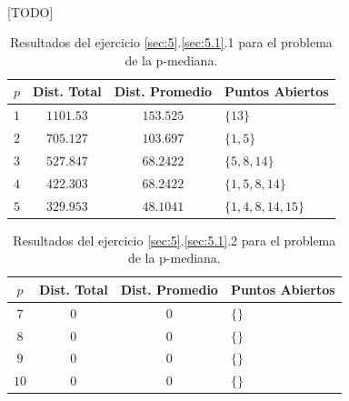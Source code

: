 \documentclass[spanish]{article}
\begin{document}
			\paragraph{}
			[TODO]


			\begin{table}[h]
				\begin{center}
					\begin{tabular}{|c || c || c || l | }
						\hline
						$p$		& Dist. Total 	& Dist. Promedio	& Puntos Abiertos	 \\ \hline \hline
						$1$ 	& $1101.53$ 		& $153.525$						& $\{13\}$ \\ \hline
						$2$ 	& $705.127$ 		& $103.697$					& $\{1,5\}$ \\ \hline
						$3$ 	& $527.847$ 		& $68.2422$					& $\{5,8,14\}$ \\ \hline
						$4$ 	& $422.303$ 		& $68.2422$					& $\{1,5,8,14\}$ \\ \hline
						$5$ 	& $329.953$ 		& $48.1041$					& $\{1,4,8,14,15\}$ \\
						\hline
					\end{tabular}
				\end{center}
				\caption{Resultados del ejercicio \ref{sec:5}.\ref{sec:5.1}.1 para el problema de la p-mediana.}
				\label{table:sol-5.3.1}
			\end{table}

			\begin{table}[h]
				\begin{center}
					\begin{tabular}{|c || c || c || l | }
						\hline
						$p$		& Dist. Total 	& Dist. Promedio	& Puntos Abiertos	 \\ \hline \hline
						$7$ 	& $0$ 					& $0$						& $\{\}$ \\ \hline
						$8$ 	& $0$ 					& $0$					& $\{\}$ \\ \hline
						$9$ 	& $0$ 					& $0$					& $\{\}$ \\ \hline
						$10$ 	& $0$ 					& $0$					& $\{\}$ \\
						\hline
					\end{tabular}
				\end{center}
				\caption{Resultados del ejercicio \ref{sec:5}.\ref{sec:5.1}.2 para el problema de la p-mediana.}
				\label{table:sol-5.3.2}
			\end{table}


	\nocite{subject:mio}
	
  
\end{document}
